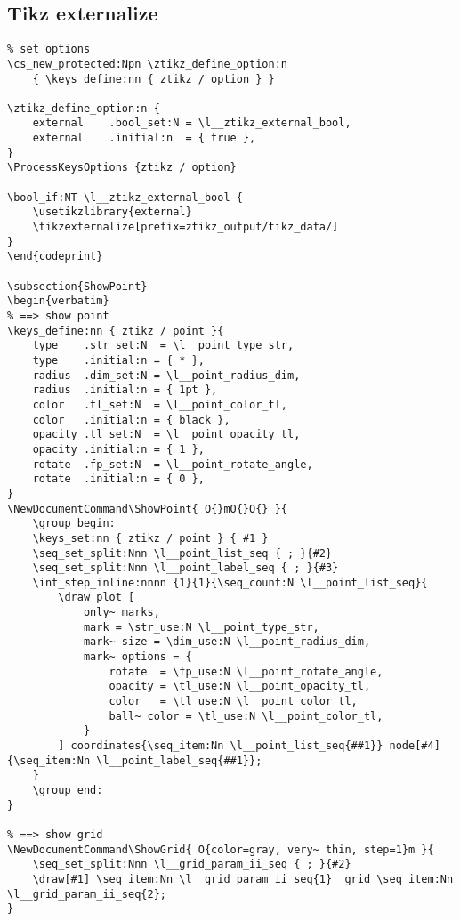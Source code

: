 \subsection{Tikz externalize}
\begin{verbatim}
% set options
\cs_new_protected:Npn \ztikz_define_option:n
    { \keys_define:nn { ztikz / option } }

\ztikz_define_option:n {
    external    .bool_set:N = \l__ztikz_external_bool,
    external    .initial:n  = { true },
}
\ProcessKeysOptions {ztikz / option}

\bool_if:NT \l__ztikz_external_bool {
    \usetikzlibrary{external}
    \tikzexternalize[prefix=ztikz_output/tikz_data/]
}
\end{codeprint}

\subsection{ShowPoint}
\begin{verbatim}
% ==> show point
\keys_define:nn { ztikz / point }{
    type    .str_set:N  = \l__point_type_str,
    type    .initial:n = { * },
    radius  .dim_set:N = \l__point_radius_dim,
    radius  .initial:n = { 1pt },
    color   .tl_set:N  = \l__point_color_tl, 
    color   .initial:n = { black },
    opacity .tl_set:N  = \l__point_opacity_tl, 
    opacity .initial:n = { 1 },
    rotate  .fp_set:N  = \l__point_rotate_angle,
    rotate  .initial:n = { 0 },  
}
\NewDocumentCommand\ShowPoint{ O{}mO{}O{} }{
    \group_begin:
    \keys_set:nn { ztikz / point } { #1 }
    \seq_set_split:Nnn \l__point_list_seq { ; }{#2}
    \seq_set_split:Nnn \l__point_label_seq { ; }{#3}
    \int_step_inline:nnnn {1}{1}{\seq_count:N \l__point_list_seq}{        
        \draw plot [
            only~ marks,
            mark = \str_use:N \l__point_type_str, 
            mark~ size = \dim_use:N \l__point_radius_dim,
            mark~ options = {
                rotate  = \fp_use:N \l__point_rotate_angle, 
                opacity = \tl_use:N \l__point_opacity_tl, 
                color   = \tl_use:N \l__point_color_tl,
                ball~ color = \tl_use:N \l__point_color_tl,
            }
        ] coordinates{\seq_item:Nn \l__point_list_seq{##1}} node[#4]{\seq_item:Nn \l__point_label_seq{##1}};
    }
    \group_end:
}

% ==> show grid
\NewDocumentCommand\ShowGrid{ O{color=gray, very~ thin, step=1}m }{
    \seq_set_split:Nnn \l__grid_param_ii_seq { ; }{#2}
    \draw[#1] \seq_item:Nn \l__grid_param_ii_seq{1}  grid \seq_item:Nn \l__grid_param_ii_seq{2};
}
\end{verbatim}

